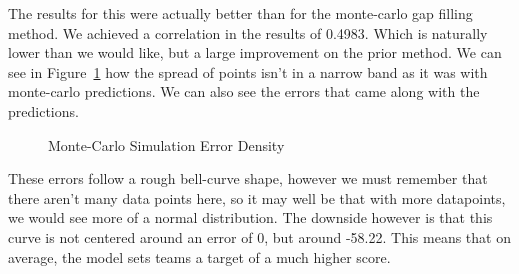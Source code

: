 The results for this were actually better than for the monte-carlo gap filling method. We achieved a correlation in the results of 0.4983. Which is naturally lower than we would like, but a large improvement 
on the prior method. We can see in Figure~\ref{DLSError} how the spread of points isn't in a narrow band as it was with monte-carlo predictions. We can also see the errors that came along with the predictions.

\begin{figure}[h]
    \centering
    \qquad
    \caption{Monte-Carlo Simulation Error Density}
    \label{DLSError}
\end{figure}


These errors follow a rough bell-curve shape, however we must remember that there aren't many data points here, so it may well be that with more datapoints, we would see more of a normal distribution. The downside however is 
that this curve is not centered around an error of 0, but around -58.22. This means that on average, the model sets teams a target of a much higher score. 

